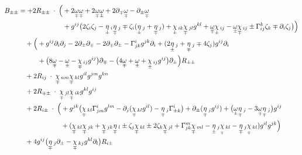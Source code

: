 \documentclass[a4paper,11pt]{article}
\numberwithin{equation}{section}
\theoremstyle{definition}
\begin{document}
\begin{align}
    B_{\pm\pm} &= 
    + 2 R_{\pm\pm} \; \cdot \; \Big(
    + 2 \underset{\mp}{\omega}\underset{\mp}{\omega}
    + 2 \underset{\mp}{\omega} \underset{\pm}{\omega}
    +2 \partial_\mp\underset{\mp}{\omega} 
    - \partial_\pm \underset{\mp}{\omega}\notag\\
     &\quad \quad \quad \quad \quad \quad \; \;
    + g^{ij} \big(2 \zeta_i \zeta_j
    - \underset{\pm}{\eta}\,_{i} \underset{\mp}{\eta}\,_{ j}
    \mp  \zeta_i(\underset{\pm}{\eta}\,_{ j}+\underset{\mp}{\eta}\,_j)
    + \underset{\pm}{\chi}\,_{ik} \underset{\mp}{\chi}\,_{jl}g^{kl}
    + \underset{\mp}{\omega} \underset{\pm}{\chi}\,_{ij}
    - \underset{\pm}{\omega} \underset{\mp}{\chi}\,_{ij}
    \pm \Gamma_{ij}^k \zeta_k 
    \mp \partial_i\zeta_j \big)
    \Big)\notag\\
    &\quad 
    +  \Big(
    + g^{ij}\partial_i \partial_j
    -2 \partial_\pm\partial_\mp
    -2 \partial_\mp \partial_\pm
    -\Gamma_{jk}^i g^{jk}\partial_i
    + (2\underset{\pm}{\eta}\,_{ j} + \underset{\mp}{\eta}\,_j \mp 4 \zeta_j) g^{ij}\partial_i\notag\\
    &\quad \quad \;\;\;
    +\big(8 \underset{\mp}{\omega}
    -\underset{\pm}{\omega} 
    -\underset{\mp}{\chi}\,_{ij} g^{ij}\big)\partial_\mp
    -\big(4 \underset{\mp}{\omega}
    +\underset{\pm}{\omega}
    +\underset{\pm}{\chi}\,_{ij} g^{ij} \big)\partial_\pm
    \Big) R_{\pm\pm}\notag\\
    &\quad 
    + 2 R_{ij} \; \cdot \; \underset{\mp}{\chi}\,_{nm} \underset{\mp}{\chi}\,_{kl}g^{il}g^{jm}g^{kn}  \\
    &\quad 
    + 2 R_{\mp\pm} \; \cdot \; \underset{\mp}{\chi}\,_{jl} \underset{\mp}{\chi}\,_{ik} g^{kl} g^{ij} \notag\\
    &\quad 
    + 2 R_{i\pm}  \; \cdot \;  \Big( + g^{jk}\big( \underset{\mp}{\chi}\,_{kl}\Gamma_{jm}^i g^{lm}
     -  \partial_j(\underset{\mp}{\chi}\,_{kl}g^{il})
    -  \underset{\mp}{\eta}\,_j \Gamma_{\pm k}^i\big)
    + \partial_\pm(\underset{\mp}{\eta}\,_j g^{ij})
    + \big(\underset{\pm}{\omega} \underset{\mp}{\eta}\,_j 
    -3 \underset{\mp}{\omega} \underset{\mp}{\eta}\,_j \big)g^{ij}\notag\\
    &\quad \quad \quad \quad \quad \quad \;
     +  (\underset{\mp}{\chi}\,_{kl} \underset{\mp}{\chi}\,_{jk}
     +  \underset{\mp}{\chi}\,_{jk} \underset{\mp}{\eta}\,_l
     \pm  \zeta_j \underset{\mp}{\chi}\,_{kl}
     \pm  2 \zeta_k \underset{\mp}{\chi}\,_{jl}
     +  \Gamma_{jk}^m \underset{\mp}{\chi}\,_{ml}
     -  \underset{\pm}{\eta}\,_j\underset{_\mp}{\chi}\,_{kl}
     - \underset{\mp}{\eta}\,_j\underset{_\mp}{\chi}\,_{kl}
     )g^{il} g^{jk}\Big)\notag\\
    &\quad 
    +4 g^{ij} \big( \underset{\mp}{\eta}\,_j \partial_\pm - \underset{\mp}{\chi}\,_{kj} g^{kl} \partial_l \big) R_{i \pm}\notag
\end{align}
\end{document}
